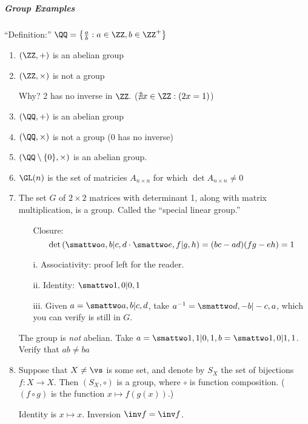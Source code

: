 \documentclass[notes.tex]{subfiles}
\begin{document}
\subparagraph{Group Examples} %
\label{subp:group_examples}
``Definition:'' $\QQ = \left\{\frac{a}{b} : a\in\ZZ, b\in\ZZ^+\right\}$

\begin{enumerate}
	\item $(\ZZ, +)$ is an abelian group
	\item $(\ZZ, \times)$ is not a group

		Why? 2 has no inverse in $\ZZ.$
		($\nexists x\in\ZZ : (2x = 1)$)
	\item $(\QQ, +)$ is an abelian group
	\item $(\QQ, \times)$ is not a group ($0$ has no inverse)
	\item $(\QQ \setminus \{0\}, \times)$ is an abelian group.
	\item $\GL(n)$ is the set of  matricies $A_{n\times n}$ for which $\det A_{n\times n} \ne 0$
	\item The set $G$ of $2\times 2$ matrices with determinant 1, along with matrix multiplication, is a group.
		Called the ``special linear group.''
		\begin{itemize}
			\item[Closure:]
			\[
				\det \left(\smattwo a,b|c,d \cdot\smattwo e,f|g,h \right) = (b c-a d) (f g-e h) = 1
			\]
			\item[i.] Associativity: proof left for the reader.
			\item[ii.] Identity: $\smattwo 1,0|0,1 $
			\item[iii.] Given $a = \smattwo a,b|c,d $, take $a^{-1} = \smattwo d,-b|-c,a $, which you can verify is still in $G$.
		\end{itemize}
		The group is \emph{not} abelian.
		Take $a = \smattwo 1,1|0,1 , b = \smattwo 1,0|1,1 $. Verify that $ab \ne ba$
	\item Suppose that $X\ne\vs$ is some set, and denote by $S_X$ the set of bijections $f:X\to X$.
		Then $(S_X, \circ)$ is a group, where $\circ$ is function composition. ($(f\circ g)$ is the function $x\mapsto f(g(x))$.)

		Identity is $x\mapsto x$. Inversion $\inv f = \inv f$.
\end{enumerate}

\end{document}
